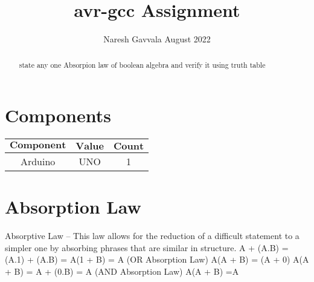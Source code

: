 \documentclass[letterpaper, 10 pt, conference]{ieeeconf}
\title{\LARGE \bf
avr-gcc Assignment
}
\author{Naresh Gavvala \hspace{9cm} August 2022}
\begin{document}
\maketitle

\begin{abstract}
state any one Absorpion law of boolean algebra and verify it using truth table
\end{abstract}
\tableofcontents

\section{Components}\hfill\break
{
\centering
\begin{tabular}{|c|c|c|}
\hline
$\boldsymbol{Component}$&$\boldsymbol{Value}$&$\boldsymbol{Count}$\\
\hline
Arduino&UNO&1\\
\hline
\end{tabular}\par
}
\vspace{5mm} %
\section{Absorption Law}
Absorptive Law – This law allows for the reduction of a difficult statement to a simpler one by absorbing phrases that are similar in structure. 
A + (A.B) = (A.1) + (A.B) = A(1 + B) = A (OR Absorption Law)
A(A + B) = (A + 0)
A(A + B) = A + (0.B) = A (AND Absorption Law)
A(A + B) =A
\end{document}
